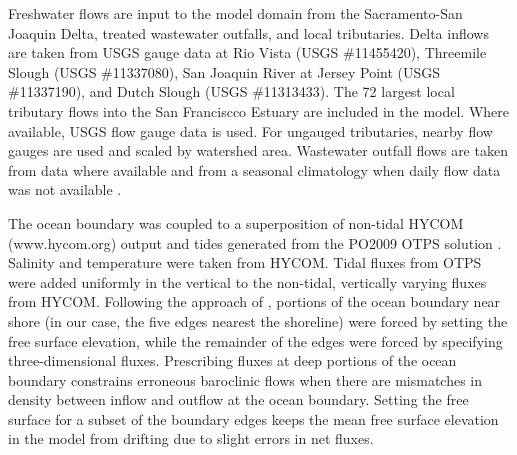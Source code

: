 \documentclass[draft]{jgr/agujournal2019}
\begin{document}
Freshwater flows are input to the model domain from the Sacramento-San
Joaquin Delta, treated wastewater outfalls, and local tributaries. Delta
inflows are taken from USGS gauge data at Rio Vista (USGS \#11455420),
Threemile Slough (USGS \#11337080), San Joaquin River at Jersey Point (USGS \#11337190),
and Dutch Slough (USGS \#11313433).
The 72 largest local tributary flows into the San Franciscco Estuary
are included in the model. Where available, USGS flow gauge data is used. For
ungauged tributaries, nearby flow gauges are used and scaled by watershed area.
Wastewater outfall flows are taken from data where available and from a
seasonal climatology when daily flow data was not available \cite{SFEImodel_validation}.

The ocean boundary was coupled to a superposition of non-tidal HYCOM
(www.hycom.org) output and tides generated from the PO2009 OTPS
solution \cite{Egbert2002}. Salinity and temperature were taken from
HYCOM. Tidal fluxes from OTPS were added uniformly in the vertical to
the non-tidal, vertically varying fluxes from HYCOM.  Following the
approach of \cite{Rayson2018}, portions of the ocean boundary near
shore (in our case, the five edges nearest the shoreline)
were forced by setting the free surface elevation, while the
remainder of the edges were forced by specifying three-dimensional
fluxes.
%
Prescribing fluxes at deep portions of the ocean boundary constrains erroneous
baroclinic flows when there are mismatches in density between inflow
and outflow at the ocean boundary. Setting the free surface for a
subset of the boundary edges keeps the mean free surface elevation in
the model from drifting due to slight errors in net fluxes.

\end{document}
